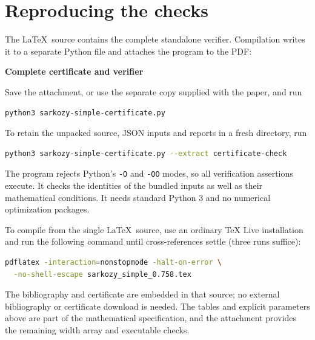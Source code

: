 \documentclass[11pt]{article}
\theoremstyle{definition}
\theoremstyle{remark}
\begin{document}
\section{Reproducing the checks}\label{app:reproduction}
The \LaTeX\ source contains the complete standalone verifier. Compilation
writes it to a separate Python file and attaches the program to the PDF:
\begin{center}
\quad\textbf{Complete certificate and verifier}
\end{center}
Save the attachment, or use the separate copy supplied with the paper,
and run
\begin{lstlisting}[language=bash]
python3 sarkozy-simple-certificate.py
\end{lstlisting}
To retain the unpacked source, JSON inputs and reports in a fresh directory,
run
\begin{lstlisting}[language=bash]
python3 sarkozy-simple-certificate.py --extract certificate-check
\end{lstlisting}
The program rejects Python's \texttt{-O} and \texttt{-OO} modes, so all
verification assertions execute. It checks the identities of the bundled
inputs as well as their mathematical conditions. It needs standard Python 3
and no numerical optimization packages.

To compile from the single \LaTeX\ source, use an ordinary TeX Live
installation and run the following command until cross-references settle
(three runs suffice):
\begin{lstlisting}[language=bash]
pdflatex -interaction=nonstopmode -halt-on-error \
  -no-shell-escape sarkozy_simple_0.758.tex
\end{lstlisting}
The bibliography and certificate are embedded in that source; no external
bibliography or certificate download is needed. The tables and explicit
parameters above are part of the mathematical specification, and the
attachment provides the remaining width array and executable checks.
\end{document}
